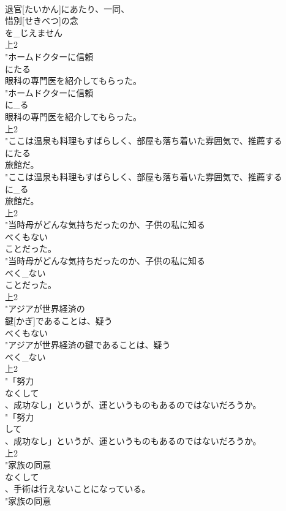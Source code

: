 \documentclass[8pt]{extreport}
\begin{document}
\begin{CJK}{UTF8}{min}
\\	退官[たいかん]にあたり、一同、
\\	惜別[せきべつ]の念
\\	を_じえません
\\	上2
\\	"ホームドクターに信頼
\\	にたる
\\	眼科の専門医を紹介してもらった。
\\	"ホームドクターに信頼
\\	に_る
\\	眼科の専門医を紹介してもらった。
\\	上2
\\	"ここは温泉も料理もすばらしく、部屋も落ち着いた雰囲気で、推薦する
\\	にたる
\\	旅館だ。
\\	"ここは温泉も料理もすばらしく、部屋も落ち着いた雰囲気で、推薦する
\\	に_る
\\	旅館だ。
\\	上2
\\	"当時母がどんな気持ちだったのか、子供の私に知る
\\	べくもない
\\	ことだった。
\\	"当時母がどんな気持ちだったのか、子供の私に知る
\\	べく_ない
\\	ことだった。
\\	上2
\\	"アジアが世界経済の
\\	鍵[かぎ]であることは、疑う
\\	べくもない
\\	"アジアが世界経済の鍵であることは、疑う
\\	べく_ない
\\	上2
\\	"「努力
\\	なくして
\\	、成功なし」というが、運というものもあるのではないだろうか。
\\	"「努力
\\	して
\\	、成功なし」というが、運というものもあるのではないだろうか。
\\	上2
\\	"家族の同意
\\	なくして
\\	、手術は行えないことになっている。
\\	"家族の同意

\end{CJK}
\end{document}
